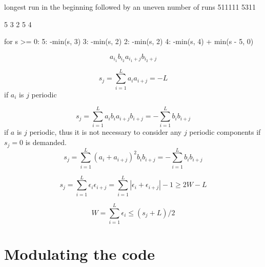 \documentclass[18pt,a4paper]{extarticle}
\begin{document}
longest run in the beginning
followed by an uneven number of runs
511111
5311

5 3 2 5 4

for s >= 0:
5: -min(s, 3)
3: -min(s, 2)
2: -min(s, 2)
4: -min(s, 4) + min(s - 5, 0)


\begin{equation}
a_{i_1}b_{i_2}a_{i_1+j}b_{i_2+j}
\end{equation}

\begin{equation}
s_j = \sum_{i=1}^{L} a_i a_{i+j} = -L
\end{equation}
if $a_i$ is $j$ periodic


\begin{equation}
s_j = \sum_{i=1}^{L} a_ib_i a_{i+j} b_{i+j} = - \sum_{i=1}^{L} b_i b_{i+j}
\end{equation}
if $a$ is $j$ periodic, thus it is not necessary to consider any $j$ periodic components if $s_j=0$ is demanded.
\begin{equation}
s_j = \sum_{i=1}^{L} (a_i + a_{i+j})^2 b_i  b_{i+j} = - \sum_{i=1}^{L} b_i b_{i+j}
\end{equation}

\begin{equation}
s_j = \sum_{i=1}^{L} \epsilon_i \epsilon_{i+j} = \sum_{i=1}^{L} |\epsilon_i + \epsilon_{i+j}| - 1 \geq 2 W - L
\end{equation}

\begin{equation}
W = \sum_{i=1}^{L} \epsilon_i \leq (s_j + L)/2
\end{equation}

\section{Modulating the code}
\end{document}
